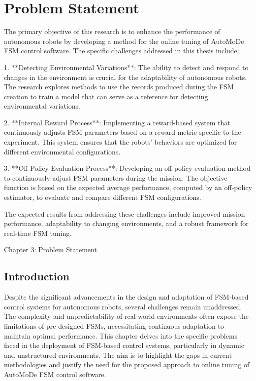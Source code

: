 \documentclass{ULBreport}
\begin{document}
\printbibliography




\chapter{Problem Statement}
The primary objective of this research is to enhance the performance of autonomous robots by developing a method for the online tuning of AutoMoDe FSM control software. The specific challenges addressed in this thesis include:

1. **Detecting Environmental Variations**: The ability to detect and respond to changes in the environment is crucial for the adaptability of autonomous robots. The research explores methods to use the records produced during the FSM creation to train a model that can serve as a reference for detecting environmental variations.

2. **Internal Reward Process**: Implementing a reward-based system that continuously adjusts FSM parameters based on a reward metric specific to the experiment. This system ensures that the robots' behaviors are optimized for different environmental configurations.

3. **Off-Policy Evaluation Process**: Developing an off-policy evaluation method to continuously adjust FSM parameters during the mission. The objective function is based on the expected average performance, computed by an off-policy estimator, to evaluate and compare different FSM configurations.

The expected results from addressing these challenges include improved mission performance, adaptability to changing environments, and a robust framework for real-time FSM tuning.

Chapter 3: Problem Statement
\section{Introduction}

Despite the significant advancements in the design and adaptation of FSM-based control systems for autonomous robots, several challenges remain unaddressed. The complexity and unpredictability of real-world environments often expose the limitations of pre-designed FSMs, necessitating continuous adaptation to maintain optimal performance. This chapter delves into the specific problems faced in the deployment of FSM-based control systems, particularly in dynamic and unstructured environments. The aim is to highlight the gaps in current methodologies and justify the need for the proposed approach to online tuning of AutoMoDe FSM control software.
\end{document}
